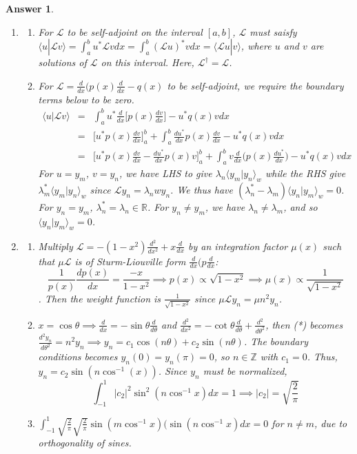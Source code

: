 \documentclass[a4paper]{article}
\newtheorem{ans}{Answer}[section]
\theoremstyle{new}
\begin{document}
\begin{ans}\leavevmode
\begin{enumerate}[label=(\alph*)]
\item
\begin{enumerate}[label=(\roman*)]
\item
For $\mathcal{L}$ to be self-adjoint on the interval $[a,b]$, $\mathcal{L}$ must saisfy $\langle u|\mathcal{L}v\rangle=\int_a^bu^*\mathcal{L}vdx=\int_a^b(\mathcal{L}u)^*vdx=\langle\mathcal{L}u|v\rangle$, where $u$ and $v$ are solutions of $\mathcal{L}$ on this interval. Here, $\mathcal{L}^\dag=\mathcal{L}$.
\item
For $\mathcal{L}=\frac{d}{dx}(p(x)\frac{d}{dx}-q(x)$ to be self-adjoint, we require the boundary terms below to be zero.
\begin{eqnarray}
\langle u|\mathcal{L}v\rangle&=&\int_a^bu^*\frac{d}{dx}\bigg[p(x)\frac{dv}{dx}\bigg]-u^*q(x)vdx\nonumber\\&=&\bigg[u^*p(x)\frac{dv}{dx}\bigg]_a^b+\int_a^b\frac{du^*}{dx}p(x)\frac{dv}{dx}-u^*q(x)vdx\nonumber\\&=&\bigg[u^*p(x)\frac{dv}{dx}-\frac{du^*}{dx}p(x)v\bigg]^b_a+\int_a^bv\frac{d}{dx}\bigg(p(x)\frac{du^*}{dx}\bigg)-u^*q(x)vdx\nonumber
\end{eqnarray}
For $u=y_m$, $v=y_n$, we have LHS to give $\lambda_n\langle y_m|y_n\rangle_w$ while the RHS give $\lambda_m^*\langle y_m|y_n\rangle_w$ since $\mathcal{L}y_n=\lambda_nwy_n$. We thus have $(\lambda_n^*-\lambda_m)\langle y_n|y_m\rangle_w=0$. For $y_n=y_m$, $\lambda_n^*=\lambda_n\in\mathbb{R}$. For $y_n\neq y_m$, we have $\lambda_n\neq\lambda_m$, and so $\langle y_n|y_m\rangle_w=0$.
\end{enumerate}
\item
\begin{enumerate}[label=(\roman*)]
\item Multiply $\mathcal{L}=-(1-x^2)\frac{d^2}{dx^2}+x\frac{d}{dx}$ by an integration factor $\mu(x)$ such that $\mu\mathcal{L}$ is of Sturm-Liouville form $\frac{d}{dx}(p\frac{d}{dx}$:
$$\frac{1}{p(x)}\frac{dp(x)}{dx}=\frac{-x}{1-x^2}\implies p(x)\propto\sqrt{1-x^2}\implies\mu(x)\propto\frac{1}{\sqrt{1-x^2}}$$. 
Then the weight function is $\frac{1}{\sqrt{1-x^2}}$ since $\mu\mathcal{L}y_n=\mu n^2y_n$.
\item $x=\cos\theta\implies\frac{d}{dx}=-\sin\theta\frac{d}{d\theta}$ and $\frac{d^2}{dx^2}=-\cot\theta\frac{d}{d\theta}+\frac{d^2}{d\theta^2}$, then (*) becomes $\frac{d^2y_n}{d\theta^2}=n^2y_n\implies y_n=c_1\cos(n\theta)+c_2\sin(n\theta)$. The boundary conditions becomes $y_n(0)=y_n(\pi)=0$, so $n\in\mathbb{Z}$ with $c_1=0$. Thus, $y_n=c_2\sin(n\cos^{-1}(x))$. Since $y_n$ must be normalized,
$$\int_{-1}^1|c_2|^2\sin^2(n\cos^{-1}x)dx=1\implies|c_2|=\sqrt{\frac{2}{\pi}}$$
\item $\int_{-1}^1\sqrt{\frac{2}{\pi}}\sqrt{\frac{2}{\pi}}\sin(m\cos^{-1}x)(\sin(n\cos^{-1}x)dx=0$ for $n\neq m$, due to orthogonality of sines.
\end{enumerate}
\end{enumerate}
\end{ans}
\end{document}
